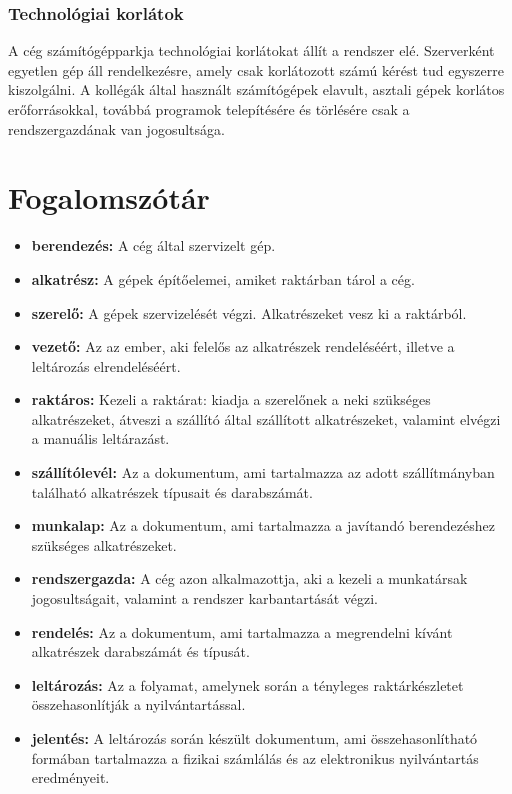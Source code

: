 \documentclass[12pt]{article}\usepackage[left=20mm,right=20mm,top=15mm,bottom=20mm]{geometry}
\begin{document}
\subsubsection{Technológiai korlátok}
A cég számítógépparkja technológiai korlátokat állít a rendszer elé.
Szerverként egyetlen gép áll rendelkezésre, amely csak korlátozott számú kérést tud egyszerre kiszolgálni. 
A kollégák által használt számítógépek elavult, asztali gépek korlátos erőforrásokkal, továbbá programok telepítésére és törlésére csak a rendszergazdának van jogosultsága.

\section{Fogalomszótár}
\begin{itemize}
\item[]\textbf{berendezés: } A cég által szervizelt gép.

\item[]\textbf{alkatrész: } A gépek építőelemei, amiket raktárban tárol a cég. 

\item[]\textbf{szerelő: } A gépek szervizelését végzi. Alkatrészeket vesz ki a raktárból.

\item[]\textbf{vezető: } Az az ember, aki felelős az alkatrészek rendeléséért, illetve a leltározás elrendeléséért.

\item[]\textbf{raktáros: } Kezeli a raktárat: kiadja a szerelőnek a neki szükséges alkatrészeket, átveszi a szállító által szállított alkatrészeket, valamint elvégzi a manuális leltárazást.

\item[]\textbf{szállítólevél: } Az a dokumentum, ami tartalmazza az adott szállítmányban található alkatrészek típusait és darabszámát.

\item[]\textbf{munkalap: } Az a dokumentum, ami tartalmazza a javítandó berendezéshez szükséges alkatrészeket. 

\item[]\textbf{rendszergazda: } A cég azon alkalmazottja, aki a kezeli a munkatársak jogosultságait, valamint a rendszer karbantartását végzi.

\item[]\textbf{rendelés: } Az a dokumentum, ami tartalmazza a megrendelni kívánt alkatrészek darabszámát és típusát.

\item[]\textbf{leltározás: } Az a folyamat, amelynek során a tényleges raktárkészletet összehasonlítják a nyilvántartással.

\item[]\textbf{jelentés: } A leltározás során készült dokumentum, ami összehasonlítható formában tartalmazza a fizikai számlálás és az elektronikus nyilvántartás eredményeit.
\end{itemize}
\end{document}
